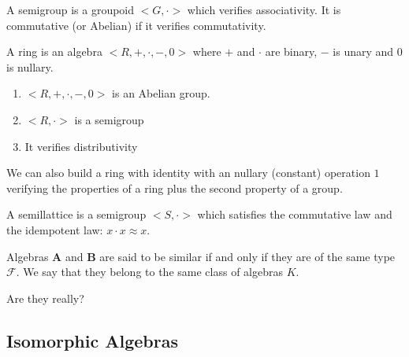\begin{example}
  \begin{definition}[semigroup] A semigroup is a groupoid $<G,\cdot>$ which
verifies associativity. It is commutative (or Abelian) if it verifies
commutativity.
  \end{definition}

  \begin{definition}[ring] A ring is an algebra $<R,+, \cdot, -, 0>$ where $+$
and $\cdot$ are binary, $-$ is unary and $0$ is nullary.
    \begin{enumerate}
    \item $<R,+, \cdot, -, 0>$ is an Abelian group.
    \item $<R,\cdot>$ is a semigroup
    \item It verifies distributivity
    \end{enumerate}
  \end{definition}

  \begin{remark} We can also build a ring with identity with an nullary
(constant) operation $1$ verifying the properties of a ring plus the second
property of a group.
  \end{remark}

  \begin{definition}[semillatice] A semillattice is a semigroup $<S,\cdot>$
which satisfies the commutative law and the idempotent law: $x \cdot x \approx
x$.
  \end{definition}

\end{example}

\begin{property}
  Algebras $\boldsymbol{A}$ and $\boldsymbol{B}$ are said to be similar if and
  only if they are of the same type $\mathcal{F}$. We say that they belong to
  the same class of algebras $K$.

  \begin{question}
    Are they really?
  \end{question}

\end{property}




\subsection{Isomorphic Algebras}


